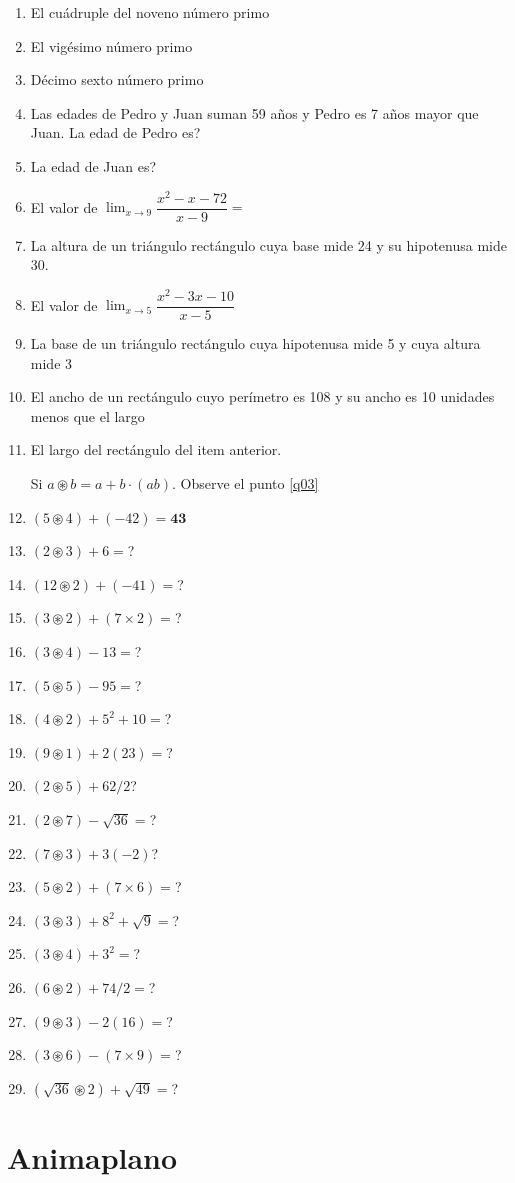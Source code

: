 \documentclass[letterpaper,11pt,twoside]{article}
\begin{document}
\begin{multicols}{2}
\begin{enumerate}
\item El cuádruple del noveno número primo
\item El vigésimo número primo
\item Décimo sexto número primo
\item Las edades de Pedro y Juan suman 59 años y Pedro es 7 años mayor que Juan. La edad de Pedro es?
\item La edad de Juan es?
\item El valor de $\displaystyle{\lim_{x\rightarrow 9}\dfrac{x^{2}-x-72}{x-9}}=$
\item La altura de un triángulo rectángulo cuya base mide 24 y su hipotenusa mide 30.
\item El valor de $\displaystyle{\lim_{x\rightarrow 5}\dfrac{x^{2}-3x-10}{x-5}}$
\item La base de un triángulo rectángulo cuya hipotenusa mide 5 y cuya altura mide 3
\item El ancho de un rectángulo cuyo perímetro es 108 y su ancho es 10 unidades menos que el largo
\item El largo del rectángulo del item anterior.

Si $a\circledast b=a+b\cdot (ab)$. Observe el punto \ref{q03}
\item $(5\circledast 4)+(-42)=\textbf{43}$ \label{q03}
\item $(2\circledast 3)+6=$?
\item $(12\circledast 2)+(-41)=$?
\item $(3\circledast 2)+(7\times 2)=$?
\item $(3\circledast 4)-13=$?
\item $(5\circledast 5)-95=$?
\item $(4\circledast 2)+5^{2}+10=$?
\item $(9\circledast 1)+2(23)=$?
\item $(2\circledast 5)+62/2$?
\item $(2\circledast 7)-\sqrt{36}=$?
\item $(7\circledast 3)+3(-2)$?
\item $(5\circledast 2)+(7\times 6)=$?
\item $(3\circledast 3)+8^{2}+\sqrt{9}=$?
\item $(3\circledast 4)+3^{2}=$?
\item $(6\circledast 2)+74/2=$?
\item $(9\circledast 3)-2(16)=$?
\item $(3\circledast 6)-(7\times 9)=$?
\item $(\sqrt{36}\circledast 2)+\sqrt{49}=$?
\end{enumerate}
\end{multicols}
\section*{Animaplano}
\begin{center}

\end{center}
\end{document}
